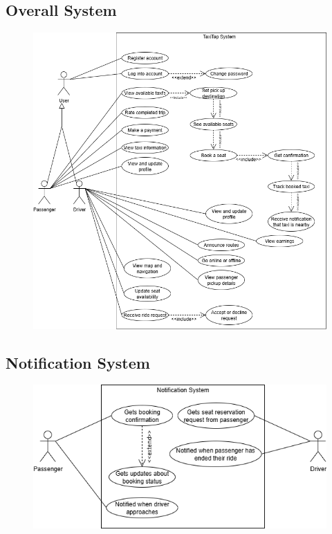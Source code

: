 \documentclass[a4paper,12pt]{article}
\begin{document}
  \subsection*{Overall System}
    \begin{figure}[H]
      \centering
      \includegraphics[width=1\textwidth]{Overall System.png} 
    \end{figure}
    \subsection*{Notification System}
    \begin{figure}[H]
      \centering
      \includegraphics[width=1\textwidth]{Notification System.png} 
    \end{figure}
\end{document}
